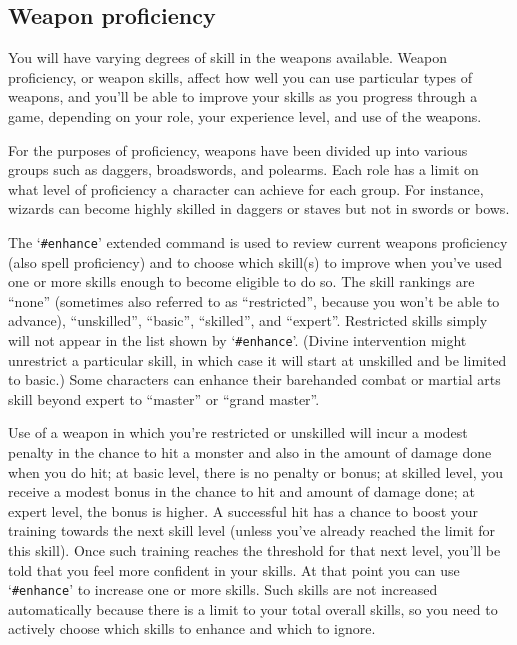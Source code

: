 \subsection*{Weapon proficiency}

You will have varying degrees of skill in the weapons available.
Weapon proficiency, or weapon skills, affect how well you can use
particular types of weapons, and you'll be able to improve your skills
as you progress through a game, depending on your role, your experience
level, and use of the weapons.

For the purposes of proficiency, weapons have
been divided up into various groups such as daggers, broadswords, and
polearms.  Each role has a limit on what level of proficiency a character
can achieve for each group.  For instance, wizards can become highly
skilled in daggers or staves but not in swords or bows.

The `{\tt \#enhance}' extended command is used to review current weapons proficiency
(also spell proficiency) and to choose which skill(s) to improve when
you've used one or more skills enough to become eligible to do so.  The
skill rankings are ``none'' (sometimes also referred to as ``restricted'',
because you won't be able to advance), ``unskilled'', ``basic'', ``skilled'',
and ``expert''.  Restricted skills simply will not appear in the list
shown by `{\tt \#enhance}'.  (Divine intervention might unrestrict a particular
skill, in which case it will start at unskilled and be limited to basic.)
Some characters can enhance their barehanded combat or martial arts skill
beyond expert to ``master'' or ``grand master''.

Use of a weapon in which you're restricted or unskilled
will incur a modest penalty in the chance to hit a monster and also in
the amount of damage done when you do hit; at basic level, there is no
penalty or bonus; at skilled level, you receive a modest bonus in the
chance to hit and amount of damage done; at expert level, the bonus is
higher.  A successful hit has a chance to boost your training towards
the next skill level (unless you've already reached the limit for this
skill).  Once such training reaches the threshold for that next level,
you'll be told that you feel more confident in your skills.  At that
point you can use `{\tt \#enhance}' to increase one or more skills.  Such skills
are not increased automatically because there is a limit to your total
overall skills, so you need to actively choose which skills to enhance
and which to ignore.

